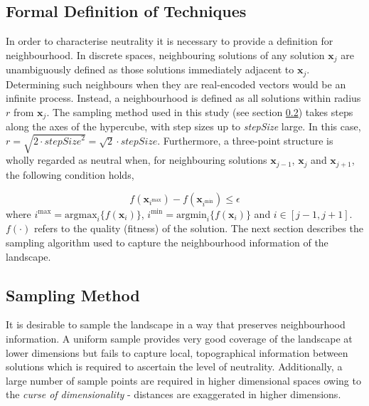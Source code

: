 \documentclass[conference]{IEEEtran}
\renewcommand{\vec}[1]{\mathbf{#1}}
\begin{document}
\subsection{Formal Definition of Techniques}
\label{neutralityMeasures}
In order to characterise neutrality it is necessary to provide a definition for neighbourhood. In discrete spaces, neighbouring solutions of any solution $\vec{x}_j$ are unambiguously defined as those solutions immediately adjacent to $\vec{x}_j$. Determining such neighbours when they are real-encoded vectors would be an infinite process. Instead, a neighbourhood is defined as all solutions within radius $r$ from $\vec{x}_j$. The sampling method used in this study (see section \ref{sampling}) takes steps along the axes of the hypercube, with step sizes up to \textit{stepSize} large. In this case, $r = \sqrt{2 \cdot {\textit{stepSize}}^2}= \sqrt{2} \cdot \textit{stepSize}$. Furthermore, a three-point structure is wholly regarded as neutral when, for neighbouring solutions $\vec{x}_{j-1}$, $\vec{x}_j$ and $\vec{x}_{j+1}$, the following condition holds,

\begin{equation}
\label{eqNeutralityDef}
	f(\vec{x}_{i^{\text{max}}}) - f(\vec{x}_{i^{\text{min}}}) \le \epsilon			 
\end{equation}
where $i^{\text{max}} = \text{argmax}_i\{f(\vec{x}_i)\}$, $i^{\text{min}} = \text{argmin}_i\{f(\vec{x}_i)\}$ and $i \in [j-1,j+1]$. $f(\cdot)$ refers to the quality (fitness) of the solution. The next section describes the sampling algorithm used to capture the neighbourhood information of the landscape.

\subsection{Sampling Method}
\label{sampling}
It is desirable to sample the landscape in a way that preserves neighbourhood information. A uniform sample provides very good coverage of the landscape at lower dimensions but fails to capture local, topographical information between solutions which is required to ascertain the level of neutrality. Additionally, a large number of sample points are required in higher dimensional spaces owing to the \textit{curse of dimensionality} - distances are exaggerated in higher dimensions. 
\end{document}
